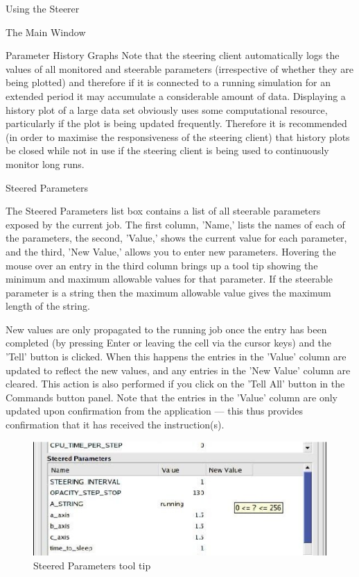 \documentclass[a4paper,twoside]{article}
\begin{document}
\begin{section}{Using the Steerer}
\begin{subsection}{The Main Window}
\begin{subsubsection}{Parameter History Graphs}
Note that the steering client automatically logs the values of all
monitored and steerable parameters (irrespective of whether they are
being plotted) and therefore if it is connected to a running
simulation for an extended period it may accumulate a considerable
amount of data.  Displaying a history plot of a large data set
obviously uses some computational resource, particularly if the plot
is being updated frequently.  Therefore it is recommended (in order to
maximise the responsiveness of the steering client) that history plots
be closed while not in use if the steering client is being used to
continuously monitor long runs.

\end{subsubsection} %

\begin{subsubsection}{Steered Parameters}
\label{sec:steered_params}

The Steered Parameters list box contains a list of all steerable
parameters exposed by the current job. The first column, 'Name,' lists
the names of each of the parameters, the second, 'Value,' shows the
current value for each parameter, and the third, 'New Value,' allows
you to enter new parameters. Hovering the mouse over an entry in the
third column brings up a tool tip showing the minimum and maximum
allowable values for that parameter.  If the steerable parameter is a
string then the maximum allowable value gives the maximum length of
the string.

New values are only propagated to the running job once the entry has
been completed (by pressing Enter or leaving the cell via the cursor
keys) and the 'Tell' button is clicked. When this happens the entries
in the 'Value' column are updated to reflect the new values, and any
entries in the 'New Value' column are cleared. This action is also
performed if you click on the 'Tell All' button in the Commands button
panel.  Note that the entries in the 'Value' column are only updated
upon confirmation from the application --- this thus provides
confirmation that it has received the instruction(s).

\begin{figure}
\centerline{\includegraphics{limits_tool_tip.eps}}
\caption{Steered Parameters tool tip}
\label{fig:limits_tool_tip}
\end{figure}


\end{subsubsection}
\end{subsection}
\end{section}
\end{document}
